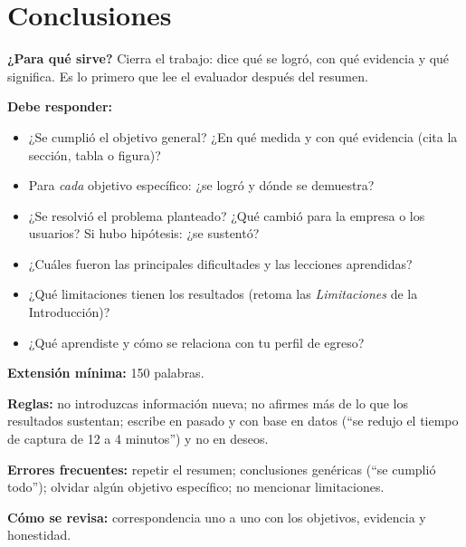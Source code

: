 
\section{Conclusiones} \label{sec:conclusiones} %

\begin{guia}
\textbf{¿Para qué sirve?} Cierra el trabajo: dice qué se logró, con qué evidencia y qué significa. Es lo primero que lee el
evaluador después del resumen.

\textbf{Debe responder:}
\begin{itemize}[nosep,leftmargin=*]
  \item ¿Se cumplió el objetivo general? ¿En qué medida y con qué evidencia (cita la sección, tabla o figura)?
  \item Para \emph{cada} objetivo específico: ¿se logró y dónde se demuestra?
  \item ¿Se resolvió el problema planteado? ¿Qué cambió para la empresa o los usuarios? Si hubo hipótesis: ¿se sustentó?
  \item ¿Cuáles fueron las principales dificultades y las lecciones aprendidas?
  \item ¿Qué limitaciones tienen los resultados (retoma las \emph{Limitaciones} de la Introducción)?
  \item ¿Qué aprendiste y cómo se relaciona con tu perfil de egreso?
\end{itemize}

\textbf{Extensión mínima:} 150 palabras.

\textbf{Reglas:} no introduzcas información nueva; no afirmes más de lo que los resultados sustentan; escribe en pasado
y con base en datos (``se redujo el tiempo de captura de 12 a 4 minutos'') y no en deseos.

\textbf{Errores frecuentes:} repetir el resumen; conclusiones genéricas (``se cumplió todo''); olvidar algún objetivo
específico; no mencionar limitaciones.

\textbf{Cómo se revisa:} correspondencia uno a uno con los objetivos, evidencia y honestidad.
\end{guia}

